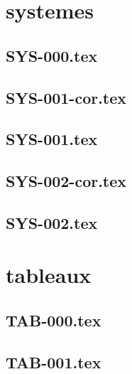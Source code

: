 \section*{systemes}
\renewcommand{\xxexo}{SYS-000.tex} 
\subsection*{\xxexo} 
\graphicspath{{../../exossystemes/equadiffs/\xxexo/}}
 
 
\renewcommand{\xxexo}{SYS-001-cor.tex} 
\subsection*{\xxexo} 
\graphicspath{{../../exossystemes/equadiffs/\xxexo/}}
 
 
\renewcommand{\xxexo}{SYS-001.tex} 
\subsection*{\xxexo} 
\graphicspath{{../../exossystemes/equadiffs/\xxexo/}}
 
 
\renewcommand{\xxexo}{SYS-002-cor.tex} 
\subsection*{\xxexo} 
\graphicspath{{../../exossystemes/equadiffs/\xxexo/}}
 
 
\renewcommand{\xxexo}{SYS-002.tex} 
\subsection*{\xxexo} 
\graphicspath{{../../exossystemes/equadiffs/\xxexo/}}
 
 
\section*{tableaux}
\renewcommand{\xxexo}{TAB-000.tex} 
\subsection*{\xxexo} 
\graphicspath{{../../exostableaux/equadiffs/\xxexo/}}
 
 
\renewcommand{\xxexo}{TAB-001.tex} 
\subsection*{\xxexo} 
\graphicspath{{../../exostableaux/equadiffs/\xxexo/}}
 
 
